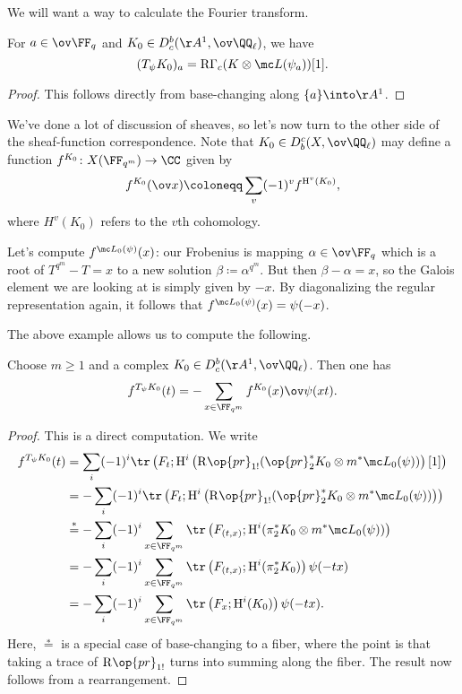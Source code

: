 \documentclass[../notes.tex]{subfiles}
\begin{document}
We will want a way to calculate the Fourier transform.
\begin{theorem} \label{thm:calculate-fourier}
	For $a\in\ov\FF_q$ and $K_0\in D^b_c(\AA^1,\ov\QQ_\ell)$, we have
	\[(T_\psi K_0)_a=\mathrm R\Gamma_c(K\otimes\mc L(\psi_a))[1].\]
\end{theorem}
\begin{proof}
	This follows directly from base-changing along $\{a\}\into\AA^1$.
\end{proof}
We've done a lot of discussion of sheaves, so let's now turn to the other side of the sheaf-function correspondence. Note that $K_0\in D_b^c(X,\ov\QQ_\ell)$ may define a function $f^{K_0}\colon X(\FF_{q^m})\to\CC$ given by
\[f^{K_0}(\ov x)\coloneqq\sum_{v}(-1)^vf^{\mathrm H^v(K_0)},\]
where $H^v(K_0)$ refers to the $v$th cohomology.
\begin{example}
	Let's compute $f^{\mc L_0(\psi)}(x)$: our Frobenius is mapping $\alpha\in\ov\FF_q$ which is a root of $T^{q^m}-T=x$ to a new solution $\beta\coloneqq\alpha^{q^m}$. But then $\beta-\alpha=x$, so the Galois element we are looking at is simply given by $-x$. By diagonalizing the regular representation again, it follows that $f^{\mc L_0(\psi)}(x)=\psi(-x)$.
\end{example}
The above example allows us to compute the following.
\begin{lemma} \label{lem:trace-fourier-sheaf}
	Choose $m\ge1$ and a complex $K_0\in D^b_c(\AA^1,\ov\QQ_\ell)$. Then one has
	\[f^{T_\psi K_0}(t)=-\sum_{x\in\FF_{q^m}}f^{K_0}(x)\ov\psi(xt).\]
\end{lemma}
\begin{proof}
	This is a direct computation. We write
	\begin{align*}
		f^{T_\psi K_0}(t) &= \sum_i(-1)^i\tr\left(F_t;\mathrm H^i\left(\mathrm R\op{pr}_{1!}(\op{pr}_2^*K_0\otimes m^*\mc L_0(\psi))\right)[1]\right) \\
		&= -\sum_i(-1)^i\tr\left(F_t;\mathrm H^i\left(\mathrm R\op{pr}_{1!}(\op{pr}_2^*K_0\otimes m^*\mc L_0(\psi))\right)\right) \\
		&\stackrel*= -\sum_i(-1)^i\sum_{x\in\FF_{q^m}}\tr\left(F_{(t,x)};\mathrm H^i(\pi_2^*K_0\otimes m^*\mc L_0(\psi))\right) \\
		&= -\sum_i(-1)^i\sum_{x\in\FF_{q^m}}\tr\left(F_{(t,x)};\mathrm H^i(\pi_2^*K_0)\right)\psi(-tx) \\
		&= -\sum_i(-1)^i\sum_{x\in\FF_{q^m}}\tr\left(F_{x};\mathrm H^i(K_0)\right)\psi(-tx).
	\end{align*}
	Here, $\stackrel*=$ is a special case of base-changing to a fiber, where the point is that taking a trace of $\mathrm R\op{pr}_{1!}$ turns into summing along the fiber. The result now follows from a rearrangement.
\end{proof}
\end{document}
